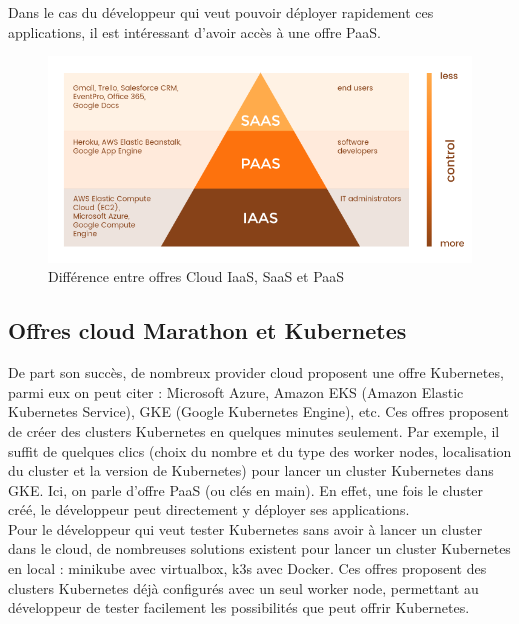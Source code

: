 \documentclass[11pt,fleqn]{book} %
\begin{document}
Dans le cas du développeur qui veut pouvoir déployer rapidement ces applications, il est intéressant d'avoir accès à une offre PaaS.
\newpage
\begin{figure}[H]\centering
\renewcommand{\figurename}{Schéma}
\includegraphics[clip,trim={0cm, 0cm, 0cm, 1cm}, scale=0.6]{Pictures/Comparaison/cloud/difference-cloud.png}
\captionsetup{margin=1.5cm,format=hang,justification=justified}
\caption[]{Différence entre offres Cloud IaaS, SaaS et PaaS \newline}
\end{figure}

\vspace{-1cm}
\subsection*{Offres cloud Marathon et Kubernetes}
De part son succès, de nombreux provider cloud proposent une offre Kubernetes, parmi eux on peut citer : Microsoft Azure, Amazon EKS (Amazon Elastic Kubernetes Service), GKE (Google Kubernetes Engine), etc. Ces offres proposent de créer des clusters Kubernetes en quelques minutes seulement. Par exemple, il suffit de quelques clics (choix du nombre et du type des worker nodes, localisation du cluster et la version de Kubernetes) pour lancer un cluster Kubernetes dans GKE. Ici, on parle d'offre PaaS (ou clés en main). En effet, une fois le cluster créé, le développeur peut directement y déployer ses applications.\\

Pour le développeur qui veut tester Kubernetes sans avoir à lancer un cluster dans le cloud, de nombreuses solutions existent pour lancer un cluster Kubernetes en local : minikube avec virtualbox, k3s avec Docker. Ces offres proposent des clusters Kubernetes déjà configurés avec un seul worker node, permettant au développeur de tester facilement les possibilités que peut offrir Kubernetes.\\
\end{document}
